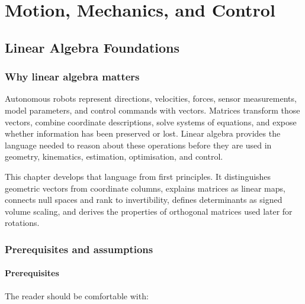 \documentclass[
  australian,
  12pt,
  letterpaper,
  DIV=11,
  numbers=noendperiod,
  twoside]{scrreprt}
\begin{document}
\cleardoublepage
{}

\part{Motion, Mechanics, and Control}

\chapter{Linear Algebra
Foundations}\label{sec-linear-algebra-foundations}

\section*{Why linear algebra matters}\label{why-linear-algebra-matters}


Autonomous robots represent directions, velocities, forces, sensor
measurements, model parameters, and control commands with vectors.
Matrices transform those vectors, combine coordinate descriptions, solve
systems of equations, and expose whether information has been preserved
or lost. Linear algebra provides the language needed to reason about
these operations before they are used in geometry, kinematics,
estimation, optimisation, and control.

This chapter develops that language from first principles. It
distinguishes geometric vectors from coordinate columns, explains
matrices as linear maps, connects null spaces and rank to invertibility,
defines determinants as signed volume scaling, and derives the
properties of orthogonal matrices used later for rotations.

\section*{Prerequisites and
assumptions}\label{prerequisites-and-assumptions}


\subsection*{Prerequisites}\label{prerequisites}

The reader should be comfortable with:
\end{document}
